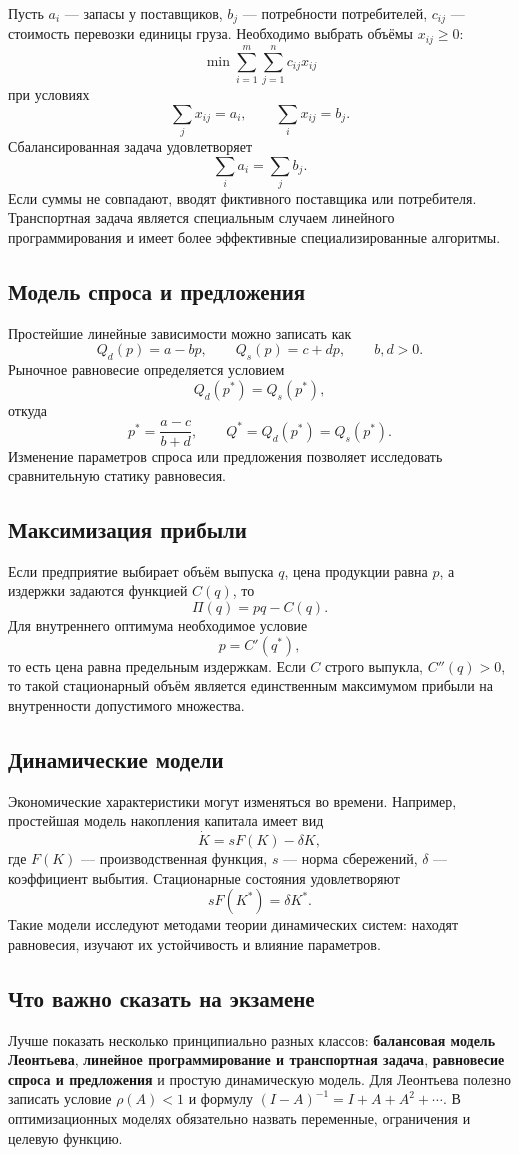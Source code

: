 Пусть $a_i$ --- запасы у поставщиков, $b_j$ --- потребности потребителей,
$c_{ij}$ --- стоимость перевозки единицы груза. Необходимо выбрать объёмы
$x_{ij}\ge0$:
\[
\boxed{
\min\sum_{i=1}^m\sum_{j=1}^n c_{ij}x_{ij}
}
\]
при условиях
\[
\sum_jx_{ij}=a_i,
\qquad
\sum_ix_{ij}=b_j.
\]
Сбалансированная задача удовлетворяет
\[
\sum_i a_i=\sum_j b_j.
\]
Если суммы не совпадают, вводят фиктивного поставщика или потребителя.
Транспортная задача является специальным случаем линейного
программирования и имеет более эффективные специализированные алгоритмы.

\subsection{Модель спроса и предложения}

Простейшие линейные зависимости можно записать как
\[
Q_d(p)=a-bp,
\qquad
Q_s(p)=c+dp,
\qquad b,d>0.
\]
Рыночное равновесие определяется условием
\[
Q_d(p^*)=Q_s(p^*),
\]
откуда
\[
\boxed{p^*=\frac{a-c}{b+d}},
\qquad
Q^*=Q_d(p^*)=Q_s(p^*).
\]
Изменение параметров спроса или предложения позволяет исследовать
сравнительную статику равновесия.

\subsection{Максимизация прибыли}

Если предприятие выбирает объём выпуска $q$, цена продукции равна $p$, а
издержки задаются функцией $C(q)$, то
\[
\Pi(q)=pq-C(q).
\]
Для внутреннего оптимума необходимое условие
\[
\boxed{p=C'(q^*)},
\]
то есть цена равна предельным издержкам. Если $C$ строго выпукла,
$C''(q)>0$, то такой стационарный объём является единственным максимумом
прибыли на внутренности допустимого множества.

\subsection{Динамические модели}

Экономические характеристики могут изменяться во времени. Например,
простейшая модель накопления капитала имеет вид
\[
\dot K=sF(K)-\delta K,
\]
где $F(K)$ --- производственная функция, $s$ --- норма сбережений,
$\delta$ --- коэффициент выбытия. Стационарные состояния удовлетворяют
\[
sF(K^*)=\delta K^*.
\]
Такие модели исследуют методами теории динамических систем: находят
равновесия, изучают их устойчивость и влияние параметров.

\subsection{Что важно сказать на экзамене}

Лучше показать несколько принципиально разных классов: \textbf{балансовая
модель Леонтьева}, \textbf{линейное программирование и транспортная задача},
\textbf{равновесие спроса и предложения} и простую динамическую модель.
Для Леонтьева полезно записать условие $\rho(A)<1$ и формулу
$(I-A)^{-1}=I+A+A^2+\cdots$. В оптимизационных моделях обязательно назвать
переменные, ограничения и целевую функцию.

\newpage
